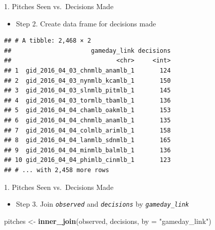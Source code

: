 \documentclass[14pt,ignorenonframetext,aspectratio = 1610]{beamer}
\newenvironment{Shaded}{\begin{snugshade}}{\end{snugshade}}
\newcommand{\KeywordTok}[1]{\textcolor[rgb]{0.13,0.29,0.53}{\textbf{{#1}}}}
\newcommand{\DataTypeTok}[1]{\textcolor[rgb]{0.13,0.29,0.53}{{#1}}}
\newcommand{\StringTok}[1]{\textcolor[rgb]{0.31,0.60,0.02}{{#1}}}
\newcommand{\NormalTok}[1]{{#1}}
\providecommand{\tightlist}{%
\setlength{\itemsep}{0pt}\setlength{\parskip}{0pt}}
\begin{document}
\begin{frame}[fragile]{1. Pitches Seen vs.~Decisions Made}

\begin{itemize}
\tightlist
\item
  Step 2. Create data frame for decisions made
\end{itemize}

\footnotesize

\begin{Shaded}
\end{Shaded}

\begin{verbatim}
## # A tibble: 2,468 × 2
##                      gameday_link decisions
##                             <chr>     <int>
## 1  gid_2016_04_03_chnmlb_anamlb_1       124
## 2  gid_2016_04_03_nynmlb_kcamlb_1       150
## 3  gid_2016_04_03_slnmlb_pitmlb_1       145
## 4  gid_2016_04_03_tormlb_tbamlb_1       136
## 5  gid_2016_04_04_chamlb_oakmlb_1       153
## 6  gid_2016_04_04_chnmlb_anamlb_1       135
## 7  gid_2016_04_04_colmlb_arimlb_1       158
## 8  gid_2016_04_04_lanmlb_sdnmlb_1       165
## 9  gid_2016_04_04_minmlb_balmlb_1       136
## 10 gid_2016_04_04_phimlb_cinmlb_1       123
## # ... with 2,458 more rows
\end{verbatim}

\end{frame}

\begin{frame}[fragile]{1. Pitches Seen vs.~Decisions Made}

\begin{itemize}
\tightlist
\item
  Step 3. Join \emph{\texttt{observed}} and \emph{\texttt{decisions}} by
  \emph{\texttt{gameday\_link}}
\end{itemize}

\footnotesize

\begin{Shaded}
\begin{Highlighting}[]
\NormalTok{pitches <-}\StringTok{ }\KeywordTok{inner_join}\NormalTok{(observed, decisions, }\DataTypeTok{by =} \StringTok{"gameday_link"}\NormalTok{)}
\end{Highlighting}
\end{Shaded}

\end{frame}
\end{document}
